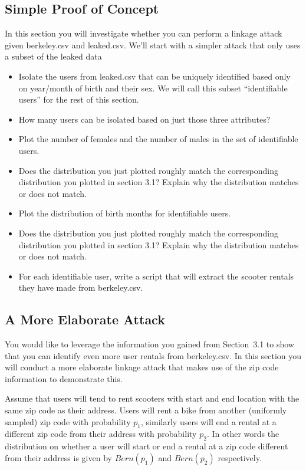 \documentclass[12pt, answers, addpoints]{exam}
\begin{document}
\subsection{Simple Proof of Concept}
In this section you will investigate whether you can perform a linkage attack given berkeley.csv and leaked.csv. We'll start with a simpler attack that only uses a subset of the leaked data
\begin{itemize}
    \item Isolate the users from leaked.csv that can be uniquely identified based only on year/month of birth and their sex. We will call this subset ``identifiable users'' for the rest of this section.
    \item How many users can be isolated based on just those three attributes?
    \item Plot the number of females and the number of males in the set of identifiable users.
    \item Does the distribution you just plotted roughly match the corresponding distribution you plotted in section 3.1? Explain why the distribution matches or does not match.
    \item Plot the distribution of birth months for identifiable users.
    \item Does the distribution you just plotted roughly match the corresponding distribution you plotted in section 3.1? Explain why the distribution matches or does not match.
    \item For each identifiable user, write a script that will extract the scooter rentals they have made from berkeley.csv.
\end{itemize}
 
\subsection{A More Elaborate Attack}
You would like to leverage the information you gained from Section~3.1 to show that you can identify even more user rentals from berkeley.csv. In this section you will conduct a more elaborate linkage attack that makes use of the zip code information to demonstrate this.

Assume that users will tend to rent scooters with  start and end location with the same zip code as their address. Users will rent a bike from another (uniformly sampled) zip code with probability $p_1$, similarly users will end a rental at a different zip code from their address with probability $p_2$. In other words the distribution on whether a user will start or end a rental at a zip code different from their address is given by $Bern(p_1)$ and $Bern(p_2)$ respectively.
\end{document}
